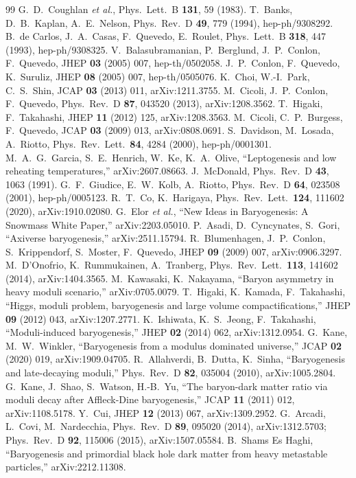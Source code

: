 \documentclass[11pt]{article}
\begin{document}
\begin{thebibliography}{99}
G.~D.~Coughlan \emph{et al.}, Phys.\ Lett.\ B \textbf{131}, 59 (1983).
T.~Banks, D.~B.~Kaplan, A.~E.~Nelson, Phys.\ Rev.\ D \textbf{49}, 779 (1994), hep-ph/9308292.
B.~de Carlos, J.~A.~Casas, F.~Quevedo, E.~Roulet, Phys.\ Lett.\ B \textbf{318}, 447 (1993), hep-ph/9308325.
V.~Balasubramanian, P.~Berglund, J.~P.~Conlon, F.~Quevedo, JHEP \textbf{03} (2005) 007, hep-th/0502058.
J.~P.~Conlon, F.~Quevedo, K.~Suruliz, JHEP \textbf{08} (2005) 007, hep-th/0505076.
K.~Choi, W.-I.~Park, C.~S.~Shin, JCAP \textbf{03} (2013) 011, arXiv:1211.3755.
M.~Cicoli, J.~P.~Conlon, F.~Quevedo, Phys.\ Rev.\ D \textbf{87}, 043520 (2013), arXiv:1208.3562.
T.~Higaki, F.~Takahashi, JHEP \textbf{11} (2012) 125, arXiv:1208.3563.
M.~Cicoli, C.~P.~Burgess, F.~Quevedo, JCAP \textbf{03} (2009) 013, arXiv:0808.0691.
S.~Davidson, M.~Losada, A.~Riotto, Phys.\ Rev.\ Lett.\ \textbf{84}, 4284 (2000), hep-ph/0001301.
M.~A.~G.~Garcia, S.~E.~Henrich, W.~Ke, K.~A.~Olive, ``Leptogenesis and low reheating temperatures,'' arXiv:2607.08663.
J.~McDonald, Phys.\ Rev.\ D \textbf{43}, 1063 (1991).
G.~F.~Giudice, E.~W.~Kolb, A.~Riotto, Phys.\ Rev.\ D \textbf{64}, 023508 (2001), hep-ph/0005123.
R.~T.~Co, K.~Harigaya, Phys.\ Rev.\ Lett.\ \textbf{124}, 111602 (2020), arXiv:1910.02080.
G.~Elor \emph{et al.}, ``New Ideas in Baryogenesis: A Snowmass White Paper,'' arXiv:2203.05010.
P.~Asadi, D.~Cyncynates, S.~Gori, ``Axiverse baryogenesis,'' arXiv:2511.15794.
R.~Blumenhagen, J.~P.~Conlon, S.~Krippendorf, S.~Moster, F.~Quevedo, JHEP \textbf{09} (2009) 007, arXiv:0906.3297.
M.~D'Onofrio, K.~Rummukainen, A.~Tranberg, Phys.\ Rev.\ Lett.\ \textbf{113}, 141602 (2014), arXiv:1404.3565.
M.~Kawasaki, K.~Nakayama, ``Baryon asymmetry in heavy moduli scenario,'' arXiv:0705.0079.
T.~Higaki, K.~Kamada, F.~Takahashi, ``Higgs, moduli problem, baryogenesis and large volume compactifications,'' JHEP \textbf{09} (2012) 043, arXiv:1207.2771.
K.~Ishiwata, K.~S.~Jeong, F.~Takahashi, ``Moduli-induced baryogenesis,'' JHEP \textbf{02} (2014) 062, arXiv:1312.0954.
G.~Kane, M.~W.~Winkler, ``Baryogenesis from a modulus dominated universe,'' JCAP \textbf{02} (2020) 019, arXiv:1909.04705.
R.~Allahverdi, B.~Dutta, K.~Sinha, ``Baryogenesis and late-decaying moduli,'' Phys.\ Rev.\ D \textbf{82}, 035004 (2010), arXiv:1005.2804.
G.~Kane, J.~Shao, S.~Watson, H.-B.~Yu, ``The baryon-dark matter ratio via moduli decay after Affleck-Dine baryogenesis,'' JCAP \textbf{11} (2011) 012, arXiv:1108.5178.
Y.~Cui, JHEP \textbf{12} (2013) 067, arXiv:1309.2952.
G.~Arcadi, L.~Covi, M.~Nardecchia, Phys.\ Rev.\ D \textbf{89}, 095020 (2014), arXiv:1312.5703; Phys.\ Rev.\ D \textbf{92}, 115006 (2015), arXiv:1507.05584.
B.~Shams Es Haghi, ``Baryogenesis and primordial black hole dark matter from heavy metastable particles,'' arXiv:2212.11308.
\end{thebibliography}
\end{document}
